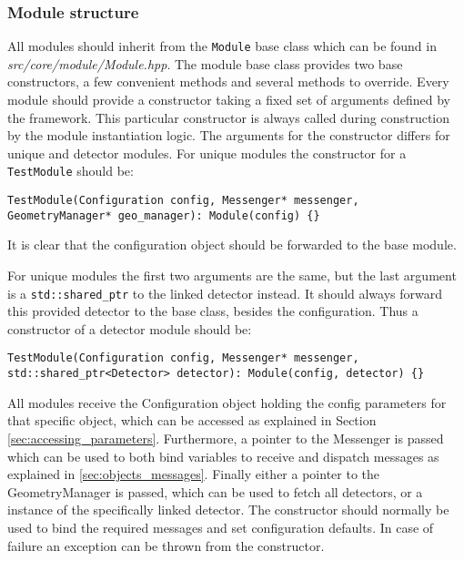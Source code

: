 \subsubsection{Module structure}
\label{sec:module_structure}
All modules should inherit from the \texttt{Module} base class which can be found in \textit{src/core/module/Module.hpp}. The module base class provides two base constructors, a few convenient methods and several methods to override. Every module should provide a constructor taking a fixed set of arguments defined by the framework. This particular constructor is always called during construction by the module instantiation logic. The arguments for the constructor differs for unique and detector modules. For unique modules the constructor for a \texttt{TestModule} should be:
\begin{verbatim}
TestModule(Configuration config, Messenger* messenger, GeometryManager* geo_manager): Module(config) {}
\end{verbatim}
It is clear that the configuration object should be forwarded to the base module.

For unique modules the first two arguments are the same, but the last argument is a \texttt{std::shared\_ptr} to the linked detector instead. It should always forward this provided detector to the base class, besides the configuration. Thus a constructor of a detector module should be:
\begin{verbatim}
TestModule(Configuration config, Messenger* messenger, std::shared_ptr<Detector> detector): Module(config, detector) {}
\end{verbatim}

All modules receive the Configuration object holding the config parameters for that specific object, which can be accessed as explained in Section \ref{sec:accessing_parameters}. Furthermore, a pointer to the Messenger is passed which can be used to both bind variables to receive and dispatch messages as explained in \ref{sec:objects_messages}. Finally either a pointer to the GeometryManager is passed, which can be used to fetch all detectors, or a instance of the specifically linked detector. The constructor should normally be used to bind the required messages and set configuration defaults. In case of failure an exception can be thrown from the constructor. 

